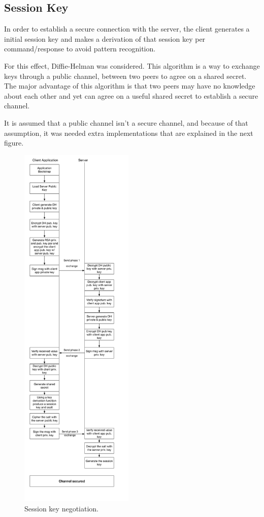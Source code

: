 \documentclass[pdftex,12pt,a4paper]{report}
\begin{document}
\subsection{Session Key}

In order to establish a secure connection with the server, the client generates a initial session key and makes a derivation of that session key per command/response to avoid pattern recognition.

For this effect, Diffie-Helman was considered. This algorithm is a way to exchange keys through a public channel, between two peers to agree on a shared secret. The major advantage of this algorithm is that two peers may have no knowledge about each other and yet can agree on a useful shared secret to establish a secure channel.

It is assumed that a public channel isn't a secure channel, and because of that assumption, it was needed extra implementations that are explained in the next figure.

\newpage

\begin{figure}[h!]
\center
\includegraphics[height=18cm]{imagens/client_app_bootstrap.pdf}
\caption{Session key negotiation.}
\end{figure}
\end{document}

